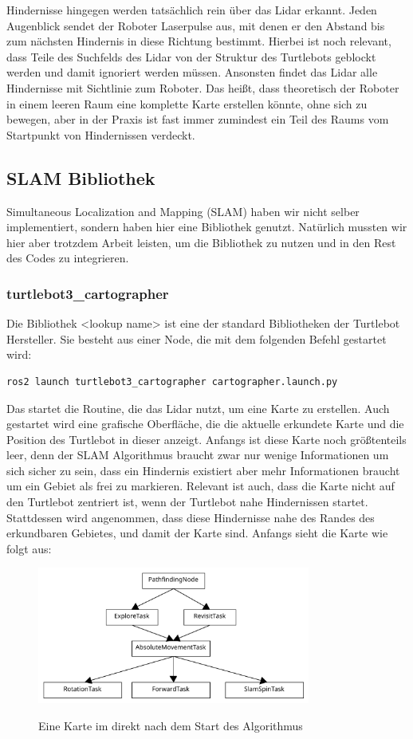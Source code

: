 Hindernisse hingegen werden tatsächlich rein über das Lidar erkannt.
Jeden Augenblick sendet der Roboter Laserpulse aus, mit denen er den Abstand bis zum nächsten Hindernis in diese Richtung
bestimmt.
Hierbei ist noch relevant, dass Teile des Suchfelds des Lidar von der Struktur des Turtlebots geblockt werden und damit
ignoriert werden müssen.
Ansonsten findet das Lidar alle Hindernisse mit Sichtlinie zum Roboter.
Das heißt, dass theoretisch der Roboter in einem leeren Raum eine komplette Karte erstellen könnte, ohne sich zu bewegen,
aber in der Praxis ist fast immer zumindest ein Teil des Raums vom Startpunkt von Hindernissen verdeckt.
\subsection{SLAM Bibliothek}\label{subsec:slam-bibliothek}
Simultaneous Localization and Mapping (SLAM) haben wir nicht selber implementiert, sondern haben hier eine Bibliothek
genutzt.
Natürlich mussten wir hier aber trotzdem Arbeit leisten, um die Bibliothek zu nutzen und in den Rest des Codes zu integrieren.
\subsubsection{turtlebot3\_cartographer} %
Die Bibliothek <lookup name>\cite{navigate_doku} ist eine der standard Bibliotheken der Turtlebot Hersteller.
Sie besteht aus einer Node, die mit dem folgenden Befehl gestartet wird:
\begin{lstlisting}[language=python,label={lst:start_cartographer_node}]
ros2 launch turtlebot3_cartographer cartographer.launch.py
\end{lstlisting}
Das startet die Routine, die das Lidar nutzt, um eine Karte zu erstellen.
Auch gestartet wird eine grafische Oberfläche, die die aktuelle erkundete Karte und die Position des Turtlebot in dieser
anzeigt.
Anfangs ist diese Karte noch größtenteils leer, denn der SLAM Algorithmus braucht zwar nur wenige Informationen um sich
sicher zu sein, dass ein Hindernis existiert aber mehr Informationen braucht um ein Gebiet als frei zu markieren.
Relevant ist auch, dass die Karte nicht auf den Turtlebot zentriert ist, wenn der Turtlebot nahe Hindernissen startet.
Stattdessen wird angenommen, dass diese Hindernisse nahe des Randes des erkundbaren Gebietes, und damit der Karte sind.
Anfangs sieht die Karte wie folgt aus:

\begin{figure}[h!]
    \caption{Eine Karte im direkt nach dem Start des Algorithmus} %
\includegraphics[width=0.8\textwidth]{img/TaskDiagram}\label{fig:map_initial}
\centering
\end{figure}

